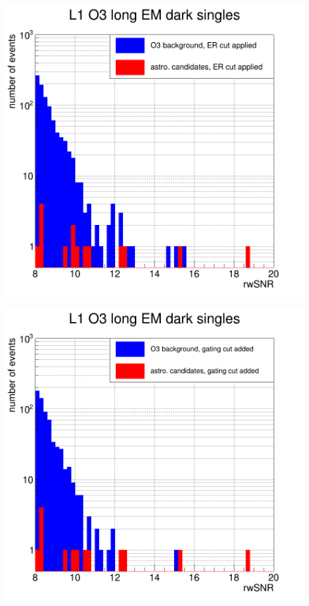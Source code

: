 \begin{figure}
  \centering
  \begin{minipage}{0.45\linewidth}
    \centering
    \includegraphics[width=\linewidth]{sectionSelection/plotsEMdark/cL1_O3_afterCutER.png}
    \label{fig:emdark_astro_aftercutER}
  \end{minipage}
  \hfill
  \begin{minipage}{0.45\linewidth}
    \centering
    \includegraphics[width=\linewidth]{sectionSelection/plotsEMdark/cL1_O3_afterCutGating.png}

\end{minipage}
\end{figure}

